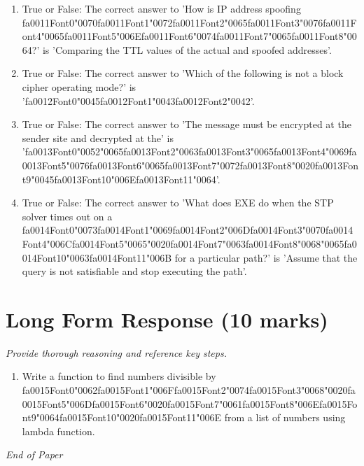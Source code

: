 \documentclass[12pt]{article}
\begin{document}
\begin{enumerate}[label=\arabic*.]
\item True or False: The correct answer to 'How is IP address spoofing {\csname fa0011Font0\endcsname\char"0070}{\csname fa0011Font1\endcsname\char"0072}{\csname fa0011Font2\endcsname\char"0065}{\csname fa0011Font3\endcsname\char"0076}{\csname fa0011Font4\endcsname\char"0065}{\csname fa0011Font5\endcsname\char"006E}{\csname fa0011Font6\endcsname\char"0074}{\csname fa0011Font7\endcsname\char"0065}{\csname fa0011Font8\endcsname\char"0064}?' is 'Comparing the TTL values of the actual and spoofed addresses'.
\item True or False: The correct answer to 'Which of the following is not a block cipher operating mode?' is '{\csname fa0012Font0\endcsname\char"0045}{\csname fa0012Font1\endcsname\char"0043}{\csname fa0012Font2\endcsname\char"0042}'.
\item True or False: The correct answer to 'The message must be encrypted at the sender site and decrypted at the' is '{\csname fa0013Font0\endcsname\char"0052}{\char"0065}{\csname fa0013Font2\endcsname\char"0063}{\csname fa0013Font3\endcsname\char"0065}{\csname fa0013Font4\endcsname\char"0069}{\csname fa0013Font5\endcsname\char"0076}{\csname fa0013Font6\endcsname\char"0065}{\csname fa0013Font7\endcsname\char"0072}{\csname fa0013Font8\endcsname\char"0020}{\csname fa0013Font9\endcsname\char"0045}{\csname fa0013Font10\endcsname\char"006E}{\csname fa0013Font11\endcsname\char"0064}'.
\item True or False: The correct answer to 'What does EXE do when the STP solver times out on a {\csname fa0014Font0\endcsname\char"0073}{\csname fa0014Font1\endcsname\char"0069}{\csname fa0014Font2\endcsname\char"006D}{\csname fa0014Font3\endcsname\char"0070}{\csname fa0014Font4\endcsname\char"006C}{\csname fa0014Font5\endcsname\char"0065}{\char"0020}{\csname fa0014Font7\endcsname\char"0063}{\csname fa0014Font8\endcsname\char"0068}{\char"0065}{\csname fa0014Font10\endcsname\char"0063}{\csname fa0014Font11\endcsname\char"006B} for a particular path?' is 'Assume that the query is not satisfiable and stop executing the path'.
\end{enumerate}

\section*{Long Form Response (10 marks)}
\textit{Provide thorough reasoning and reference key steps.}
\begin{enumerate}[label=\arabic*.]
\item Write a function to find numbers divisible by {\csname fa0015Font0\endcsname\char"0062}{\csname fa0015Font1\endcsname\char"006F}{\csname fa0015Font2\endcsname\char"0074}{\csname fa0015Font3\endcsname\char"0068}{\char"0020}{\csname fa0015Font5\endcsname\char"006D}{\csname fa0015Font6\endcsname\char"0020}{\csname fa0015Font7\endcsname\char"0061}{\csname fa0015Font8\endcsname\char"006E}{\csname fa0015Font9\endcsname\char"0064}{\csname fa0015Font10\endcsname\char"0020}{\csname fa0015Font11\endcsname\char"006E} from a list of numbers using lambda
function.
\end{enumerate}

\vfill
\noindent\textit{End of Paper}
\end{document}
